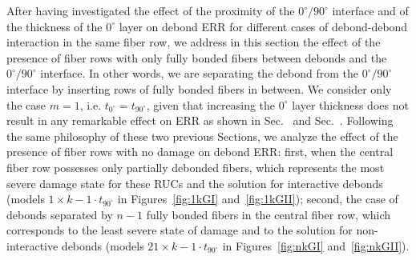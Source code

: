\documentclass[Review,sagev,times]{sagej}
\begin{document}
After having investigated the effect of the proximity of the $0^{\circ}/90^{\circ}$ interface and of the thickness of the $0^{\circ}$ layer on debond ERR for different cases of debond-debond interaction in the same fiber row, we address in this section the effect of the presence of fiber rows with only fully bonded fibers between debonds and the $0^{\circ}/90^{\circ}$ interface. In other words, we are separating the debond from the $0^{\circ}/90^{\circ}$ interface by inserting rows of fully bonded fibers in between. We consider only the case $m=1$, i.e. $t_{0^{\circ}}=t_{90^{\circ}}$, given that increasing the $0^{\circ}$ layer thickness does not result in any remarkable effect on ERR as shown in Sec.~ and Sec.~. Following the same philosophy of these two previous Sections, we analyze the effect of the presence of fiber rows with no damage on debond ERR: first, when the central fiber row possesses only partially debonded fibers, which represents the most severe damage state for these RUCs and the solution for interactive debonds (models $1\times k-1\cdot t_{90^{\circ}}$ in Figures~\ref{fig:1kGI} and~\ref{fig:1kGII}); second, the case of debonds separated by $n-1$ fully bonded fibers in the central fiber row, which corresponds to the least severe state of damage and to the solution for non-interactive debonds (models $21\times k-1\cdot t_{90^{\circ}}$ in Figures~\ref{fig:nkGI} and~\ref{fig:nkGII}).\\%
\end{document}
